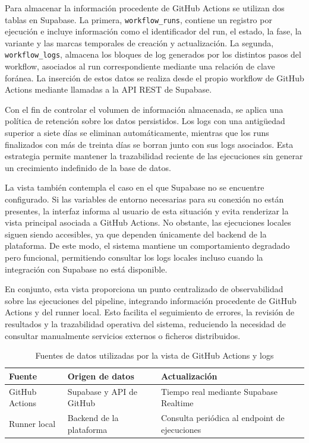 Para almacenar la información procedente de GitHub Actions se utilizan dos tablas en Supabase. La primera, \texttt{workflow\_runs}, contiene un registro por ejecución e incluye información como el identificador del run, el estado, la fase, la variante y las marcas temporales de creación y actualización. La segunda, \texttt{workflow\_logs}, almacena los bloques de log generados por los distintos pasos del workflow, asociados al run correspondiente mediante una relación de clave foránea. La inserción de estos datos se realiza desde el propio workflow de GitHub Actions mediante llamadas a la API REST de Supabase.

Con el fin de controlar el volumen de información almacenada, se aplica una política de retención sobre los datos persistidos. Los logs con una antigüedad superior a siete días se eliminan automáticamente, mientras que los runs finalizados con más de treinta días se borran junto con sus logs asociados. Esta estrategia permite mantener la trazabilidad reciente de las ejecuciones sin generar un crecimiento indefinido de la base de datos.

La vista también contempla el caso en el que Supabase no se encuentre configurado. Si las variables de entorno necesarias para su conexión no están presentes, la interfaz informa al usuario de esta situación y evita renderizar la vista principal asociada a GitHub Actions. No obstante, las ejecuciones locales siguen siendo accesibles, ya que dependen únicamente del backend de la plataforma. De este modo, el sistema mantiene un comportamiento degradado pero funcional, permitiendo consultar los logs locales incluso cuando la integración con Supabase no está disponible.

En conjunto, esta vista proporciona un punto centralizado de observabilidad sobre las ejecuciones del pipeline, integrando información procedente de GitHub Actions y del runner local. Esto facilita el seguimiento de errores, la revisión de resultados y la trazabilidad operativa del sistema, reduciendo la necesidad de consultar manualmente servicios externos o ficheros distribuidos.

\begin{table}[H]
\centering
\renewcommand{\arraystretch}{1.3}
\begin{tabular}{|l|l|l|}
\hline
\textbf{Fuente} & \textbf{Origen de datos} & \textbf{Actualización} \\ \hline
GitHub Actions & Supabase y API de GitHub & Tiempo real mediante Supabase Realtime \\ \hline
Runner local & Backend de la plataforma & Consulta periódica al endpoint de ejecuciones \\ \hline
\end{tabular}
\caption{Fuentes de datos utilizadas por la vista de GitHub Actions y logs}
\label{tab:fuentes-github-actions-logs}
\end{table}


